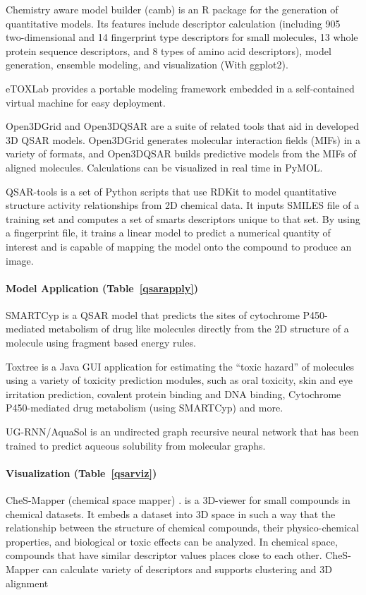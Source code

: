 Chemistry aware model builder (camb) \cite{Murrell_2015} is an R package for the generation of quantitative models. Its features include descriptor calculation (including 905 two-dimensional and 14 fingerprint type descriptors for small molecules, 13 whole protein sequence descriptors, and 8 types of amino acid descriptors), model generation, ensemble modeling, and visualization (With ggplot2).

eTOXLab \cite{Carri__2015} provides a portable modeling framework embedded in a self-contained virtual machine for easy deployment.

Open3DGrid and Open3DQSAR \cite{Tosco_2010} are a suite of related tools that aid in developed 3D QSAR models.  Open3DGrid generates molecular interaction fields (MIFs) in a variety of formats, and Open3DQSAR builds predictive models from the MIFs of aligned molecules.  Calculations can be visualized in real time in PyMOL.

QSAR-tools is a set of Python scripts that use RDKit to model quantitative structure activity relationships from 2D chemical data. It inputs SMILES file of a training set and computes a set of smarts descriptors unique to that set. By using a fingerprint file, it trains a linear model to predict a numerical quantity of interest and is capable of mapping the model onto the compound to produce an image.

\paragraph{Model Application (Table~\ref{qsarapply})}

SMARTCyp \cite{Rydberg_2010} is a QSAR model that predicts the sites of cytochrome P450-mediated metabolism of drug like molecules directly from the 2D structure of a molecule using fragment based energy rules.

Toxtree \cite{Patlewicz_2008} is a Java GUI application for estimating the ``toxic hazard'' of molecules using a variety of toxicity prediction modules, such as oral toxicity, skin  and eye irritation prediction, covalent protein binding and DNA binding, Cytochrome P450-mediated drug metabolism (using SMARTCyp) and more.

UG-RNN/AquaSol \cite{Lusci_2013} is an undirected graph recursive neural network that has been trained to predict aqueous solubility from molecular graphs. 

\paragraph{Visualization (Table~\ref{qsarviz})}
CheS-Mapper (chemical space mapper) \cite{G_tlein_2012,G_tlein_2014}. is a 3D-viewer for small compounds in chemical datasets. It embeds a dataset into 3D space in such a way that the relationship between the structure of chemical compounds, their physico-chemical properties, and biological or toxic effects can be analyzed. In chemical space, compounds that have similar descriptor values places close to each other. CheS-Mapper can calculate variety of descriptors and supports clustering and 3D alignment  

